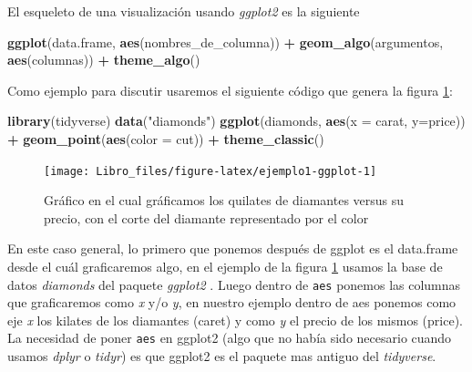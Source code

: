\documentclass[]{book}
\newenvironment{Shaded}{\begin{snugshade}}{\end{snugshade}}
\newcommand{\DataTypeTok}[1]{\textcolor[rgb]{0.13,0.29,0.53}{#1}}
\newcommand{\KeywordTok}[1]{\textcolor[rgb]{0.13,0.29,0.53}{\textbf{#1}}}
\newcommand{\NormalTok}[1]{#1}
\newcommand{\OperatorTok}[1]{\textcolor[rgb]{0.81,0.36,0.00}{\textbf{#1}}}
\newcommand{\StringTok}[1]{\textcolor[rgb]{0.31,0.60,0.02}{#1}}
\begin{document}
El esqueleto de una visualización usando \emph{ggplot2} es la siguiente

\begin{Shaded}
\begin{Highlighting}[]
\KeywordTok{ggplot}\NormalTok{(data.frame, }\KeywordTok{aes}\NormalTok{(nombres_de_columna)) }\OperatorTok{+}\StringTok{ }\KeywordTok{geom_algo}\NormalTok{(argumentos, }
    \KeywordTok{aes}\NormalTok{(columnas)) }\OperatorTok{+}\StringTok{ }\KeywordTok{theme_algo}\NormalTok{()}
\end{Highlighting}
\end{Shaded}

Como ejemplo para discutir usaremos el siguiente código que genera la
figura \ref{fig:ejemplo1-ggplot}:

\begin{Shaded}
\begin{Highlighting}[]
\KeywordTok{library}\NormalTok{(tidyverse)}
\KeywordTok{data}\NormalTok{(}\StringTok{"diamonds"}\NormalTok{)}
\KeywordTok{ggplot}\NormalTok{(diamonds, }\KeywordTok{aes}\NormalTok{(}\DataTypeTok{x =}\NormalTok{ carat, }\DataTypeTok{y=}\NormalTok{price)) }\OperatorTok{+}\StringTok{ }\KeywordTok{geom_point}\NormalTok{(}\KeywordTok{aes}\NormalTok{(}\DataTypeTok{color =}\NormalTok{ cut)) }\OperatorTok{+}\StringTok{ }\KeywordTok{theme_classic}\NormalTok{()}
\end{Highlighting}
\end{Shaded}

\begin{figure}

{\centering \texttt{[image: Libro\_files/figure-latex/ejemplo1-ggplot-1]} 

}

\caption{Gráfico en el cual gráficamos los quilates de diamantes versus su precio, con el corte del diamante representado por el color}\label{fig:ejemplo1-ggplot}
\end{figure}

En este caso general, lo primero que ponemos después de ggplot es el
data.frame desde el cuál graficaremos algo, en el ejemplo de la figura
\ref{fig:ejemplo1-ggplot} usamos la base de datos \emph{diamonds} del
paquete \emph{ggplot2} \citep{Wickhamggplot}. Luego dentro de
\texttt{aes} ponemos las columnas que graficaremos como \emph{x} y/o
\emph{y}, en nuestro ejemplo dentro de aes ponemos como eje \emph{x} los
kilates de los diamantes (caret) y como \emph{y} el precio de los mismos
(price). La necesidad de poner \texttt{aes} en ggplot2 (algo que no
había sido necesario cuando usamos \emph{dplyr} o \emph{tidyr}) es que
ggplot2 es el paquete mas antiguo del \emph{tidyverse}.
\end{document}
